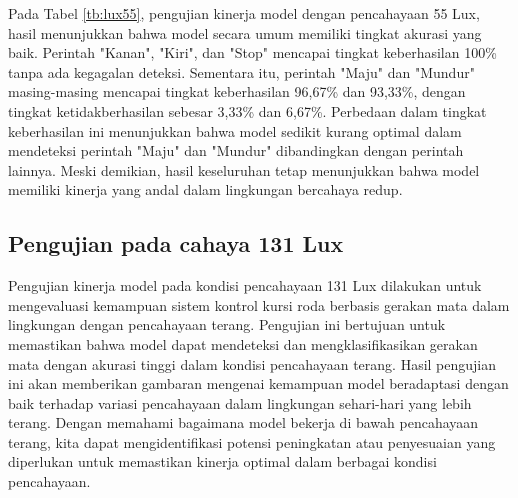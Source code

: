 Pada Tabel \ref{tb:lux55}, pengujian kinerja model dengan pencahayaan 55 Lux, hasil menunjukkan bahwa model secara umum memiliki tingkat akurasi yang baik. Perintah "Kanan", "Kiri", dan "Stop" mencapai tingkat keberhasilan 100\% tanpa ada kegagalan deteksi. Sementara itu, perintah "Maju" dan "Mundur" masing-masing mencapai tingkat keberhasilan 96,67\% dan 93,33\%, dengan tingkat ketidakberhasilan sebesar 3,33\% dan 6,67\%. Perbedaan dalam tingkat keberhasilan ini menunjukkan bahwa model sedikit kurang optimal dalam mendeteksi perintah "Maju" dan "Mundur" dibandingkan dengan perintah lainnya. Meski demikian, hasil keseluruhan tetap menunjukkan bahwa model memiliki kinerja yang andal dalam lingkungan bercahaya redup.

\subsection{Pengujian pada cahaya 131 Lux}

Pengujian kinerja model pada kondisi pencahayaan 131 Lux dilakukan untuk mengevaluasi kemampuan sistem kontrol kursi roda berbasis gerakan mata dalam lingkungan dengan pencahayaan terang. Pengujian ini bertujuan untuk memastikan bahwa model dapat mendeteksi dan mengklasifikasikan gerakan mata dengan akurasi tinggi dalam kondisi pencahayaan terang. Hasil pengujian ini akan memberikan gambaran mengenai kemampuan model beradaptasi dengan baik terhadap variasi pencahayaan dalam lingkungan sehari-hari yang lebih terang. Dengan memahami bagaimana model bekerja di bawah pencahayaan terang, kita dapat mengidentifikasi potensi peningkatan atau penyesuaian yang diperlukan untuk memastikan kinerja optimal dalam berbagai kondisi pencahayaan.

